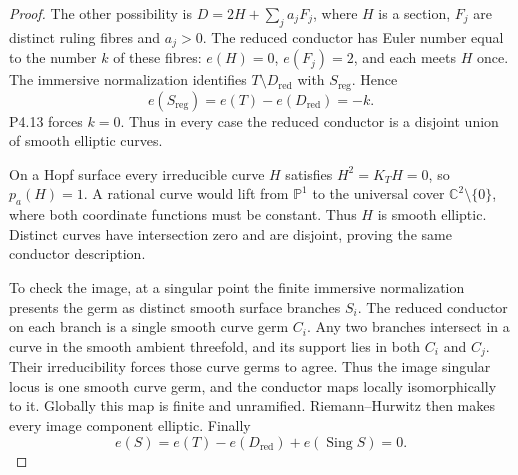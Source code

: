\begin{proof}
The other possibility is $D=2H+\sum_j a_jF_j$, where $H$ is a
section, $F_j$ are distinct ruling fibres and $a_j>0$.
The reduced conductor has Euler number equal to the number $k$
of these fibres: $e(H)=0$, $e(F_j)=2$, and each meets $H$ once.
The immersive normalization identifies $T\setminus D_{\mathrm{red}}$
with $S_{\mathrm{reg}}$. Hence
\[
 e(S_{\mathrm{reg}})=e(T)-e(D_{\mathrm{red}})=-k.
\]
P4.13 forces $k=0$. Thus in every case the reduced conductor is
a disjoint union of smooth elliptic curves.

On a Hopf surface every irreducible curve $H$ satisfies
$H^2=K_TH=0$, so $p_a(H)=1$. A rational curve would lift from
$\mathbb P^1$ to the universal cover $\mathbb C^2\setminus\{0\}$,
where both coordinate functions must be constant. Thus $H$
is smooth elliptic. Distinct curves have intersection zero and
are disjoint, proving the same conductor description.

To check the image, at a singular point the finite immersive
normalization presents the germ as distinct smooth surface
branches $S_i$. The reduced conductor on each branch is a single
smooth curve germ $C_i$. Any two branches intersect in a curve
in the smooth ambient threefold, and its support lies in both
$C_i$ and $C_j$. Their irreducibility forces those curve germs
to agree. Thus the image singular locus is one smooth curve
germ, and the conductor maps locally isomorphically to it.
Globally this map is finite and unramified. Riemann--Hurwitz
then makes every image component elliptic. Finally
\[
 e(S)=e(T)-e(D_{\mathrm{red}})+e(\operatorname{Sing}S)=0.
\]
\end{proof}

